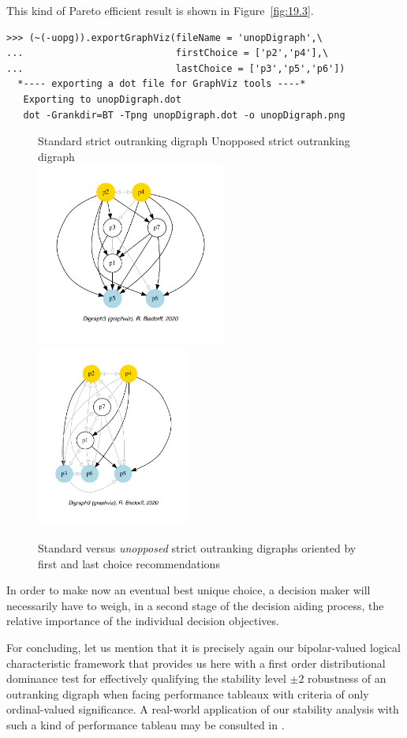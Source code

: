 This kind of Pareto efficient result is shown in Figure~\vref{fig:19.3}.
\begin{lstlisting}
>>> (~(-uopg)).exportGraphViz(fileName = 'unopDigraph',\
...                           firstChoice = ['p2','p4'],\
...                           lastChoice = ['p3','p5','p6'])
  *---- exporting a dot file for GraphViz tools ----*
   Exporting to unopDigraph.dot
   dot -Grankdir=BT -Tpng unopDigraph.dot -o unopDigraph.png
\end{lstlisting}
\begin{figure}[ht]
  Standard strict outranking digraph \hfill Unopposed strict outranking digraph \\
  \includegraphics[height=6cm]{Figures/19-1-stdg.pdf}\hfill
  \includegraphics[height=6cm]{Figures/19-3-unopDigraph.pdf}
\caption{Standard versus \emph{unopposed} strict outranking digraphs oriented by first and last choice recommendations} 
\label{fig:19.3}       %
\end{figure}

In order to make now an eventual best unique choice, a decision maker will necessarily have to weigh, in a second stage of the decision aiding process, the relative importance of the individual decision objectives.

For concluding, let us mention that it is precisely again our bipolar-valued logical characteristic framework that provides us here with a first order distributional dominance test for effectively qualifying the stability level $\pm 2$ robustness of an outranking digraph when facing performance tableaux with criteria of only ordinal-valued significance. A real-world application of our stability analysis with such a kind of performance tableau may be consulted in \citep{BIS-2015bestPoster}.

